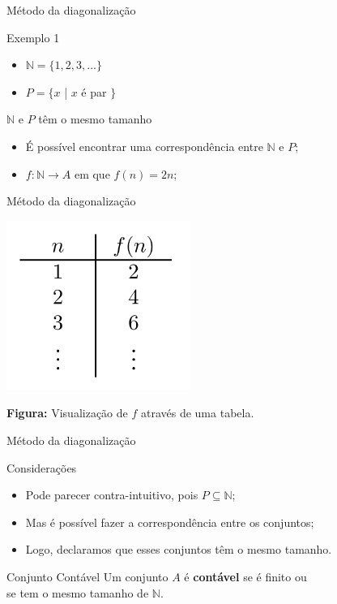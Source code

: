\documentclass[xcolor=dvipsnames,table]{beamer}
\begin{document}
	\begin{frame}{Método da diagonalização}
		\begin{block}{Exemplo 1}
			\begin{itemize}
				\item $\mathbb{N} = \{ 1, 2, 3, ... \}$
				\item $P = \{ x$ | $x$ é par $\}$
			\end{itemize} 
		\end{block} \pause
		\begin{block}{$\mathbb{N}$ e $P$ têm o mesmo tamanho} \pause
			\begin{itemize}
				\item É possível encontrar uma correspondência entre $\mathbb{N}$ e $P$; \pause
				\item $f:\mathbb{N} \rightarrow A$ em que $f(n) = 2n$;
			\end{itemize}
		\end{block}	
	\end{frame}
	
	\begin{frame}{Método da diagonalização}
		\begin{center}
    		\includegraphics[width=6cm]{images/fn2n.png}
    		
    		{\bf Figura:} Visualização de $f$ através de uma tabela.
  		\end{center}
	\end{frame}
	
	\begin{frame}{Método da diagonalização}
		\begin{block}{Considerações}
			\begin{itemize}
				\item Pode parecer contra-intuitivo, pois $P \subseteq \mathbb{N}$; \pause
				\item Mas é possível fazer a correspondência entre os conjuntos; \pause
				\item Logo, declaramos que esses conjuntos têm o mesmo tamanho.			
			\end{itemize}
		\end{block} \pause
		\begin{block}{Conjunto Contável}
			Um conjunto $A$ é {\bf contável} se é finito ou \\se tem o mesmo tamanho de $\mathbb{N}$.
		\end{block}
	\end{frame}
	
\end{document}
